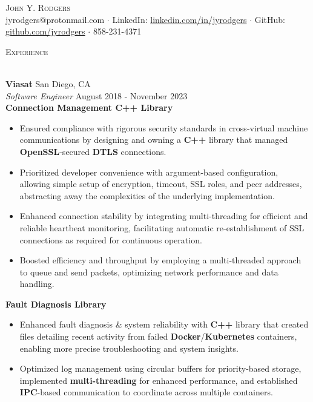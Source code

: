 \documentclass[a4paper]{article}
\newcommand{\forceindent}{\leavevmode{\parindent=1em\indent}}
\newcommand{\lineunder} {
    \vspace*{-8pt} \\
    \hspace*{-18pt} \hrulefill \\
}
\newcommand{\header} [1] {
    {\hspace*{-18pt}\vspace*{6pt} \textsc{#1}}
    \vspace*{-6pt} \lineunder
}
\begin{document}
\vspace*{-40pt}



\vspace*{-10pt}
\begin{center}
	{\Huge \scshape {John Y. Rodgers}}\\
	jyrodgers@protonmail.com $\cdot$ LinkedIn: \href{https://www.linkedin.com/in/jyrodgers/}{linkedin.com/in/jyrodgers} $\cdot$ GitHub: \href{https://github.com/jyrodgers}{github.com/jyrodgers} $\cdot$  858-231-4371 \\
\end{center}

\header{Experience}
\vspace{1mm}

\textbf{Viasat} \hfill San Diego, CA\\
\textit{Software Engineer} \hfill August 2018 - November 2023\\
\vspace{1mm}
\forceindent \textbf{Connection Management C++ Library} \\
\vspace{-1mm}
\begin{itemize}
	\item Ensured compliance with rigorous security standards in cross-virtual machine communications by designing and owning a \textbf{C++} library that managed \textbf{OpenSSL}-secured \textbf{DTLS} connections.
	\item Prioritized developer convenience with argument-based configuration, allowing simple setup of encryption, timeout, SSL roles, and peer addresses, abstracting away the complexities of the underlying implementation.
	\item Enhanced connection stability by integrating multi-threading for efficient and reliable heartbeat monitoring, facilitating automatic re-establishment of SSL connections as required for continuous operation.
	\item Boosted efficiency and throughput by employing a multi-threaded approach to queue and send packets, optimizing network performance and data handling.
\end{itemize}
\vspace{-1mm}
\forceindent \textbf{Fault Diagnosis Library} \\
\vspace{-1mm}
\begin{itemize}
	\item Enhanced fault diagnosis \& system reliability with \textbf{C++} library that created files detailing recent activity from failed \textbf{Docker}/\textbf{Kubernetes} containers, enabling more precise troubleshooting and system insights.
	\item Optimized log management using circular buffers for priority-based storage, implemented \textbf{multi-threading} for enhanced performance, and established \textbf{IPC}-based communication to coordinate across multiple containers.
\end{itemize}
\end{document}
